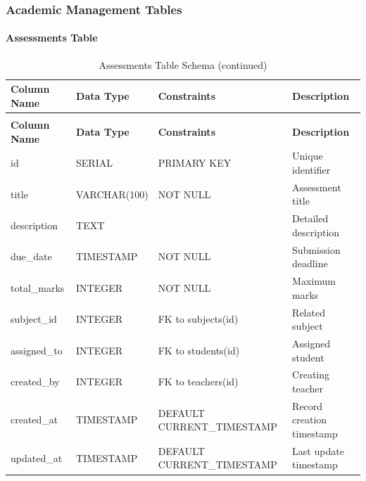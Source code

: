 \documentclass[12pt,a4paper]{report}
\begin{document}
\subsubsection{Academic Management Tables}

\paragraph{Assessments Table}
\begin{longtable}{|p{3cm}|p{3cm}|p{2cm}|p{6cm}|}
\caption{Assessments Table Schema}
\label{tab:assessments}\\
\hline
\textbf{Column Name} & \textbf{Data Type} & \textbf{Constraints} & \textbf{Description} \\
\hline
\endfirsthead
\caption[]{Assessments Table Schema (continued)}\\
\hline
\textbf{Column Name} & \textbf{Data Type} & \textbf{Constraints} & \textbf{Description} \\
\hline
\endhead
id & SERIAL & PRIMARY KEY & Unique identifier \\
\hline
title & VARCHAR(100) & NOT NULL & Assessment title \\
\hline
description & TEXT & & Detailed description \\
\hline
due\_date & TIMESTAMP & NOT NULL & Submission deadline \\
\hline
total\_marks & INTEGER & NOT NULL & Maximum marks \\
\hline
subject\_id & INTEGER & FK to subjects(id) & Related subject \\
\hline
assigned\_to & INTEGER & FK to students(id) & Assigned student \\
\hline
created\_by & INTEGER & FK to teachers(id) & Creating teacher \\
\hline
created\_at & TIMESTAMP & DEFAULT CURRENT\_TIMESTAMP & Record creation timestamp \\
\hline
updated\_at & TIMESTAMP & DEFAULT CURRENT\_TIMESTAMP & Last update timestamp \\
\hline
\end{longtable}
\end{document}
